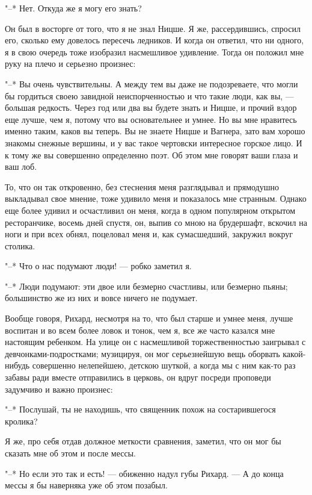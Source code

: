 "--* Нет. Откуда же я могу его знать?

Он был в восторге  от того, что я не знал  Ницше. Я же, рассердившись,
спросил  его,  сколько ему  довелось  пересечь  ледников. И  когда  он
ответил, что  ни одного, я  в свою очередь тоже  изобразил насмешливое
удивление. Тогда он положил мне руку на плечо и серьезно произнес:

"--* Вы очень чувствительны. А между  тем вы даже не подозреваете, что
могли бы гордиться  своею завидной неиспорченностью и  что такие люди,
как вы,  --- большая  редкость. Через  год или два  вы будете  знать и
Ницше, и прочий вздор еще лучше,  чем я, потому что вы основательнее и
умнее. Но вы мне нравитесь именно таким, каков вы теперь. Вы не знаете
Ницше и  Вагнера, зато  вам хорошо  знакомы снежные  вершины, и  у вас
такое чертовски  интересное горское  лицо. И к  тому же  вы совершенно
определенно поэт. Об этом мне говорят ваши глаза и ваш лоб.

То, что он так откровенно, без стеснения меня разглядывал и прямодушно
выкладывал свое мнение,  тоже удивило меня и  показалось мне странным.
Однако  еще  более  удивил  и  осчастливил  он  меня,  когда  в  одном
популярном  открытом ресторанчике,  восемь дней  спустя, он,  выпив со
мною на брудершафт,  вскочил на ноги и при всех  обнял, поцеловал меня
и, как сумасшедший, закружил вокруг столика.

"--* Что о нас подумают люди! --- робко заметил я.

"--*  Люди подумают:  эти двое  или безмерно  счастливы, или  безмерно
пьяны; большинство же из них и вовсе ничего не подумает.

Вообще говоря,  Рихард, несмотря на то,  что был старше и  умнее меня,
лучше  воспитан  и  во  всем  более  ловок и  тонок,  чем  я,  все  же
часто  казался  мне настоящим  ребенком.  На  улице он  с  насмешливой
торжественностью заигрывал с девчонками-подростками; музицируя, он мог
серьезнейшую вещь оборвать какой-нибудь совершенно нелепейшею, детскою
шуткой, а когда  мы с ним как-то раз забавы  ради вместе отправились в
церковь, он вдруг посреди проповеди задумчиво и важно произнес:

"--* Послушай, ты  не находишь, что священник  похож на состарившегося
кролика?

Я же, про  себя отдав должное меткости сравнения, заметил,  что он мог
бы сказать мне об этом и после мессы.

"--* Но если это так и есть!  --- обиженно надул губы Рихард. --- А до
конца мессы я бы наверняка уже об этом позабыл.

